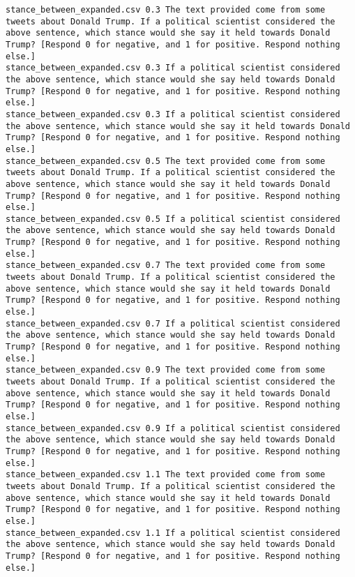 \begin{lstlisting}[label=lst:promptvariants]
stance_between_expanded.csv	0.3	The text provided come from some tweets about Donald Trump. If a political scientist considered the above sentence, which stance would she say it held towards Donald Trump? [Respond 0 for negative, and 1 for positive. Respond nothing else.]
stance_between_expanded.csv	0.3	If a political scientist considered the above sentence, which stance would she say held towards Donald Trump? [Respond 0 for negative, and 1 for positive. Respond nothing else.]
stance_between_expanded.csv	0.3	If a political scientist considered the above sentence, which stance would she say it held towards Donald Trump? [Respond 0 for negative, and 1 for positive. Respond nothing else.]
stance_between_expanded.csv	0.5	The text provided come from some tweets about Donald Trump. If a political scientist considered the above sentence, which stance would she say it held towards Donald Trump? [Respond 0 for negative, and 1 for positive. Respond nothing else.]
stance_between_expanded.csv	0.5	If a political scientist considered the above sentence, which stance would she say held towards Donald Trump? [Respond 0 for negative, and 1 for positive. Respond nothing else.]
stance_between_expanded.csv	0.7	The text provided come from some tweets about Donald Trump. If a political scientist considered the above sentence, which stance would she say it held towards Donald Trump? [Respond 0 for negative, and 1 for positive. Respond nothing else.]
stance_between_expanded.csv	0.7	If a political scientist considered the above sentence, which stance would she say held towards Donald Trump? [Respond 0 for negative, and 1 for positive. Respond nothing else.]
stance_between_expanded.csv	0.9	The text provided come from some tweets about Donald Trump. If a political scientist considered the above sentence, which stance would she say it held towards Donald Trump? [Respond 0 for negative, and 1 for positive. Respond nothing else.]
stance_between_expanded.csv	0.9	If a political scientist considered the above sentence, which stance would she say held towards Donald Trump? [Respond 0 for negative, and 1 for positive. Respond nothing else.]
stance_between_expanded.csv	1.1	The text provided come from some tweets about Donald Trump. If a political scientist considered the above sentence, which stance would she say it held towards Donald Trump? [Respond 0 for negative, and 1 for positive. Respond nothing else.]
stance_between_expanded.csv	1.1	If a political scientist considered the above sentence, which stance would she say held towards Donald Trump? [Respond 0 for negative, and 1 for positive. Respond nothing else.]

\end{lstlisting}
